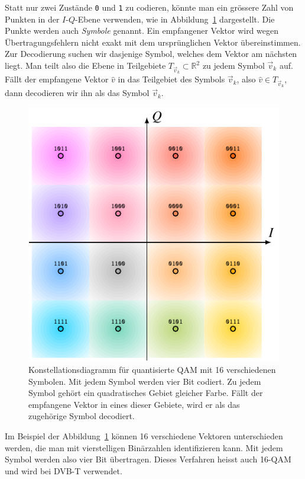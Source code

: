 Statt nur zwei Zustände \texttt{0} und \texttt{1} zu codieren, könnte man
ein grössere Zahl von Punkten in der $I$-$Q$-Ebene verwenden, wie in
Abbildung~\ref{figure:qam:konstellation} dargestellt.
Die Punkte werden auch {\em Symbole} genannt.
Ein empfangener Vektor wird wegen Übertragungsfehlern nicht exakt mit
dem ursprünglichen Vektor übereinstimmen.
Zur Decodierung suchen wir dasjenige Symbol, welches dem Vektor am
nächsten liegt.
Man teilt also die Ebene in Teilgebiete $T_{\vec{v}_k}\subset \mathbb R^2$
zu jedem Symbol $\vec{v}_k$ auf.
Fällt der empfangene Vektor $\hat{v}$ in das Teilgebiet des Symbols
$\vec{v}_k$, also $\hat{v}\in T_{\vec{v}_k}$, dann decodieren wir ihn
als das Symbol $\vec{v}_k$.

\begin{figure}
\centering
\includegraphics{applications/qam/images/konstellation.pdf}
\caption{Konstellationsdiagramm für quantisierte QAM mit 16 verschiedenen
Symbolen.
Mit jedem Symbol werden vier Bit codiert.
Zu jedem Symbol gehört ein quadratisches Gebiet gleicher Farbe.
Fällt der empfangene Vektor in eines dieser Gebiete, wird er als
das zugehörige Symbol decodiert.
\label{figure:qam:konstellation}}
\end{figure}

Im Beispiel der Abbildung~\ref{figure:qam:konstellation} können 16 
verschiedene Vektoren unterschieden werden, die man mit vierstelligen
Binärzahlen identifizieren kann.
Mit jedem Symbol werden also vier Bit übertragen.
Dieses Verfahren heisst auch 16-QAM und wird bei DVB-T verwendet.

